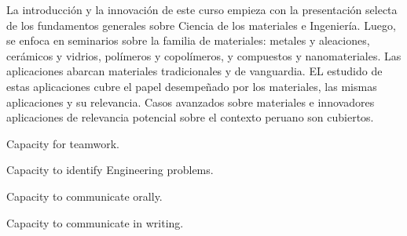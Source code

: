 
\begin{syllabus}


\begin{justification}
La introducción y la innovación de este curso empieza con la presentación selecta de los fundamentos generales sobre Ciencia de los materiales e Ingeniería.
Luego, se enfoca en seminarios sobre la familia de materiales: metales y aleaciones, cerámicos y vidrios, polímeros y copolímeros, y compuestos y nanomateriales.
Las aplicaciones abarcan materiales tradicionales y de vanguardia. EL estudido de estas aplicaciones cubre el papel desempeñado por los materiales, 
las mismas aplicaciones y su relevancia. Casos avanzados sobre materiales e innovadores aplicaciones de relevancia potencial sobre el contexto peruano son cubiertos.


\end{justification}

\begin{goals}
\item Capacity for teamwork.
\item Capacity to identify Engineering problems.
\item Capacity to communicate orally.
\item Capacity to communicate in writing.

\end{goals}

\begin{outcomes}

% 


\end{outcomes}
\end{syllabus}
